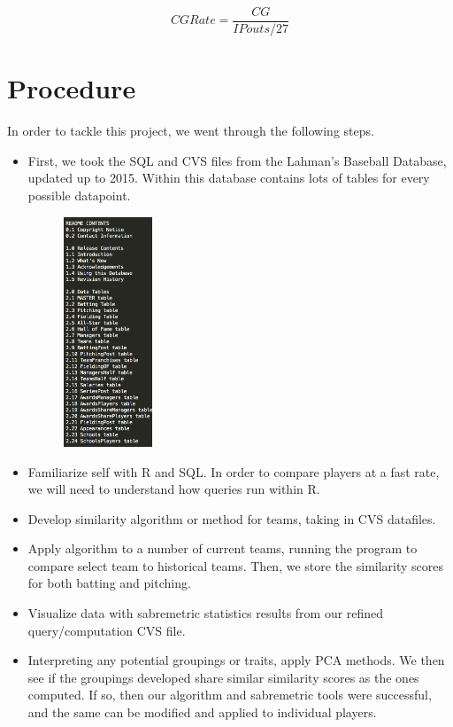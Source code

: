 \documentclass[12pt]{article}
\numberwithin{equation}{subsection}
\begin{document}
\begin{equation}
	CGRate = \frac{CG}{IPouts/27}
\end{equation}

\section{Procedure}
In order to tackle this project, we went through the following steps.
\begin{itemize}
	\item First, we took the SQL and CVS files from the Lahman's Baseball Database, updated up to 2015. Within this database contains lots of tables for every possible datapoint.
    \begin{figure}[H]
	\centering
	\includegraphics[width=0.25\textwidth]{tables}
	\end{figure}
    \item Familiarize self with R and SQL. In order to compare players at a fast rate, we will need to understand how queries run within R. 
    \item Develop similarity algorithm or method for teams, taking in CVS datafiles.
    \item Apply algorithm to a number of current teams, running the program to compare select team to historical teams. Then, we store the similarity scores for both batting and pitching.
    \item Visualize data with sabremetric statistics results from our refined query/computation CVS file.
    \item Interpreting any potential groupings or traits, apply PCA methods. We then see if the groupings developed share similar similarity scores as the ones computed. If so, then our algorithm and sabremetric tools were successful, and the same can be modified and applied to individual players.
\end{itemize}
\end{document}
